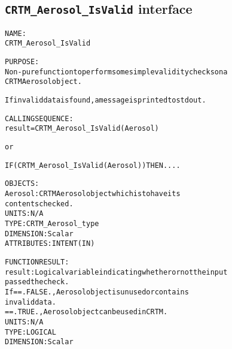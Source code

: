 \subsection{\texttt{CRTM\_Aerosol\_IsValid} interface}
  \label{sec:CRTM_Aerosol_IsValid_interface}
  \begin{alltt}
 
  NAME:
        CRTM_Aerosol_IsValid
 
  PURPOSE:
        Non-pure function to perform some simple validity checks on a
        CRTM Aerosol object. 
 
        If invalid data is found, a message is printed to stdout.
 
  CALLING SEQUENCE:
        result = CRTM_Aerosol_IsValid( Aerosol )
 
          or
 
        IF ( CRTM_Aerosol_IsValid( Aerosol ) ) THEN....
 
  OBJECTS:
        Aerosol:       CRTM Aerosol object which is to have its
                       contents checked.
                       UNITS:      N/A
                       TYPE:       CRTM_Aerosol_type
                       DIMENSION:  Scalar
                       ATTRIBUTES: INTENT(IN)
 
  FUNCTION RESULT:
        result:        Logical variable indicating whether or not the input
                       passed the check.
                       If == .FALSE., Aerosol object is unused or contains
                                      invalid data.
                          == .TRUE.,  Aerosol object can be used in CRTM.
                       UNITS:      N/A
                       TYPE:       LOGICAL
                       DIMENSION:  Scalar
 
  \end{alltt}
